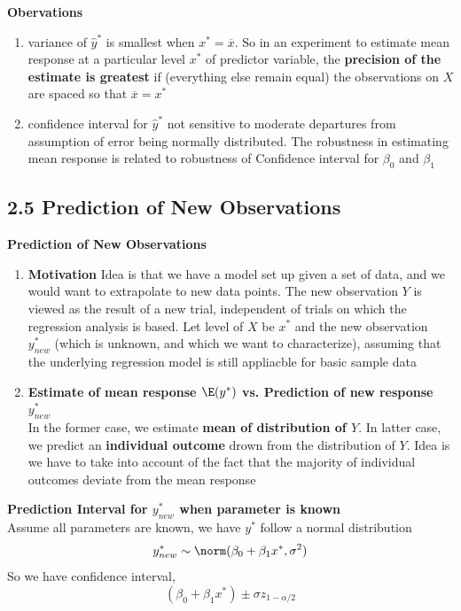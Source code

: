 \documentclass[11pt]{article}
\begin{document}
\begin{defn*}
	\textbf{Obervations}
	\begin{enumerate}
		\item variance of $\hat{y}^*$ is smallest when $x^* = \overline{x}$. So in an experiment to estimate mean response at a particular level $x^*$ of predictor variable, the \textbf{precision of the estimate is greatest} if (everything else remain equal) the observations on $X$ are spaced so that $\overline{x} = x^*$
		\item confidence interval for $\hat{y}^*$ not sensitive to moderate departures from assumption of error being normally distributed. The robustness in estimating mean response is related to robustness of Confidence interval for $\beta_0$ and $\beta_1$
	\end{enumerate}
\end{defn*}


\subsection*{2.5 Prediction of New Observations}

\begin{defn*} \textbf{Prediction of New Observations}
	\begin{enumerate}
		\item \textbf{Motivation}  Idea is that we have a model set up given a set of data, and we would want to extrapolate to new data points. The new observation $Y$ is viewed as the result of a new trial, independent of trials on which the regression analysis is based. Let level of $X$ be $x^*$ and the new observation $y^*_{new}$ (which is unknown, and which we want to characterize), assuming that the underlying regression model is still appliacble for basic sample data 
		\item \textbf{Estimate of mean response $\E(y^*)$ vs. Prediction of new response $y^*_{new}$ } \\
		In the former case, we estimate \textbf{mean of distribution of $Y$}. In latter case, we predict an \textbf{individual outcome} drown from the distribution of $Y$. Idea is we have to take into account of the fact that the majority of individual outcomes deviate from the mean response
	\end{enumerate}
\end{defn*}


\begin{defn*}
	\textbf{Prediction Interval for $y^*_{new}$ when parameter is known} \\
	Assume all parameters are known, we have $y^*$ follow a normal distribution 
	\[
		y^*_{new} \sim \norm(\beta_0 + \beta_1 x^*, \sigma^2)
	\]
	So we have confidence interval, 
	\[
		\left( \beta_0 + \beta_1 x^* \right) \pm \sigma z_{1-\alpha/2} 
	\]
\end{defn*}
\end{document}
